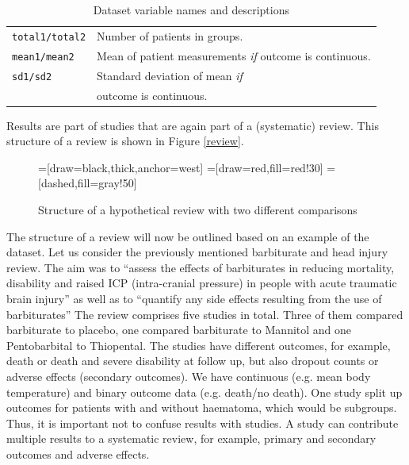 \documentclass[11pt,a4paper,twoside]{book}\usepackage[]{graphicx}\usepackage[]{color}
\begin{document}
\begin{table}[ht]
\begin{center}
\begin{tabular}{l l}
      \texttt{total1/total2} & Number of patients in groups.\\
      \texttt{mean1/mean2} & Mean of patient measurements \textit{if} outcome is continuous.\\
      \texttt{sd1/sd2} & Standard deviation of mean \textit{if} \\ &outcome is continuous.
    \end{tabular}
  \caption{Dataset variable names and descriptions  \label{variable}}
  \label{variable}
  \end{center}
\end{table}

Results are part of studies that are again part of a (systematic) review. This structure of a review is shown in Figure \ref{review}. 

\begin{figure}
=[draw=black,thick,anchor=west]
=[draw=red,fill=red!30]
=[dashed,fill=gray!50]
\caption{Structure of a hypothetical review with two different comparisons}
\label{review.structure}
\end{figure}

\vspace{0mm}
The structure of a review will now be outlined based on an example of the dataset. Let us consider the previously mentioned barbiturate and head injury review. The aim was to ``assess the effects of barbiturates in reducing mortality, disability and raised ICP (intra-cranial pressure) in people with acute traumatic brain injury'' as well as to ``quantify any side effects resulting from the use of barbiturates'' %
The review comprises five studies in total. Three of them compared barbiturate to placebo, one compared barbiturate to Mannitol and one Pentobarbital to Thiopental. The studies have different outcomes, for example, death or death and severe disability at follow up, but also dropout counts or adverse effects (secondary outcomes). 
We have continuous (e.g. mean body temperature) and binary outcome data (e.g. death/no death). One study split up outcomes for patients with and without haematoma, which would be subgroups. Thus, it is important not to confuse results with studies. A study can contribute multiple results to a systematic review, for example, primary and secondary outcomes and adverse effects. 
\end{document}
